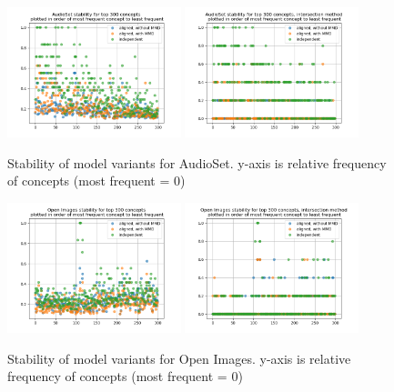 \begin{figure}[H]
    \centering
    \includegraphics[width=0.45\textwidth]{images/results/audioset_stability.png}
    \includegraphics[width=0.45\textwidth]{images/results/audioset_stability_ixn.png}
    \caption{
        Stability of model variants for AudioSet. y-axis is relative frequency of concepts (most frequent = 0)
    }
\end{figure}


\begin{figure}[H]
    \centering
    \includegraphics[width=0.45\textwidth]{images/results/openimages_stability.png}
    \includegraphics[width=0.45\textwidth]{images/results/openimages_stability_ixn.png}
    \caption{
        Stability of model variants for Open Images. y-axis is relative frequency of concepts (most frequent = 0)
    }
\end{figure}

